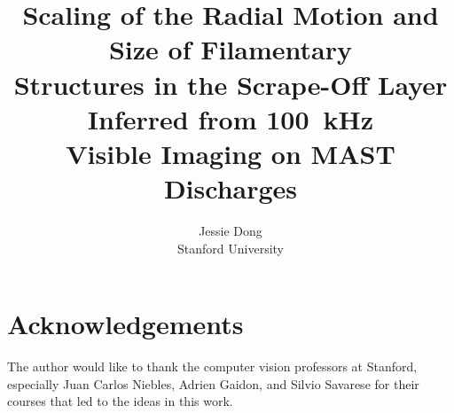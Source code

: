 \documentclass{article}
\title{Scaling of the Radial Motion and Size of Filamentary\\Structures in the Scrape-Off Layer Inferred from 100~kHz\\Visible Imaging on \nShotsStats{} MAST Discharges}
\author{Jessie Dong \\
Stanford University}
\begin{document}
\maketitle
\lhead{}
\renewcommand{\footrulewidth}{1.5pt}

\begin{abstract}

\end{abstract}











\section*{Acknowledgements}
The author would like to thank the computer vision professors at Stanford, especially Juan Carlos Niebles, Adrien Gaidon, and Silvio Savarese for their courses that led to the ideas in this work.




\clearpage
\appendix

\end{document}
